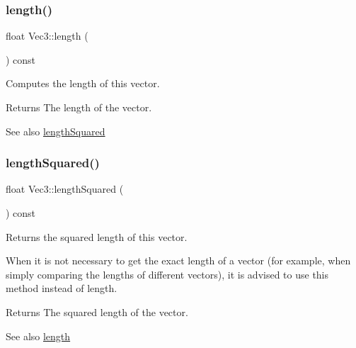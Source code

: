 \subsubsection{\texorpdfstring{length()}{length()}\hspace{0.1cm}{\footnotesize\ttfamily [2/2]}}
{\footnotesize\ttfamily float Vec3\+::length (\begin{DoxyParamCaption}{ }\end{DoxyParamCaption}) const\hspace{0.3cm}{\ttfamily [inline]}}

Computes the length of this vector.

\begin{DoxyReturn}{Returns}
The length of the vector.
\end{DoxyReturn}
\begin{DoxySeeAlso}{See also}
\hyperlink{classVec3_a31d057d72313ad255d61fb684a37c24f}{length\+Squared} 
\end{DoxySeeAlso}
\mbox{\label{classVec3_a31d057d72313ad255d61fb684a37c24f}} 
\subsubsection{\texorpdfstring{length\+Squared()}{lengthSquared()}\hspace{0.1cm}{\footnotesize\ttfamily [1/2]}}
{\footnotesize\ttfamily float Vec3\+::length\+Squared (\begin{DoxyParamCaption}{ }\end{DoxyParamCaption}) const\hspace{0.3cm}{\ttfamily [inline]}}

Returns the squared length of this vector.

When it is not necessary to get the exact length of a vector (for example, when simply comparing the lengths of different vectors), it is advised to use this method instead of length.

\begin{DoxyReturn}{Returns}
The squared length of the vector.
\end{DoxyReturn}
\begin{DoxySeeAlso}{See also}
\hyperlink{classVec3_a54be9143adb871a478ea3de19ca23f3b}{length} 
\end{DoxySeeAlso}
\mbox{\label{classVec3_a31d057d72313ad255d61fb684a37c24f}} 
